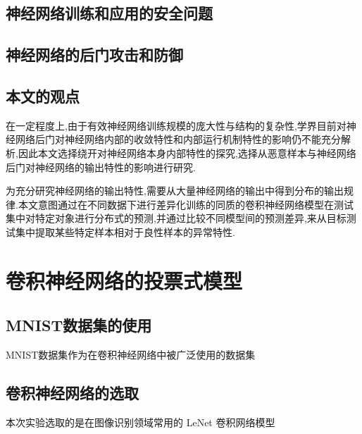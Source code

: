 \section{神经网络训练和应用的安全问题}


\section{神经网络的后门攻击和防御}

\section{本文的观点}

在一定程度上,由于有效神经网络训练规模的庞大性与结构的复杂性,学界目前对神经网络后门对神经网络内部的收敛特性和内部运行机制特性的影响仍不能充分解析,因此本文选择绕开对神经网络本身内部特性的探究,选择从恶意样本与神经网络后门对神经网络的输出特性的影响进行研究.

为充分研究神经网络的输出特性,需要从大量神经网络的输出中得到分布的输出规律.本文意图通过在不同数据下进行差异化训练的同质的卷积神经网络模型在测试集中对特定对象进行分布式的预测,并通过比较不同模型间的预测差异,来从目标测试集中提取某些特定样本相对于良性样本的异常特性.

\chapter{卷积神经网络的投票式模型}

\section{MNIST数据集的使用}

MNIST数据集作为在卷积神经网络中被广泛使用的数据集

\section{卷积神经网络的选取}

本次实验选取的是在图像识别领域常用的 LeNet 卷积网络模型